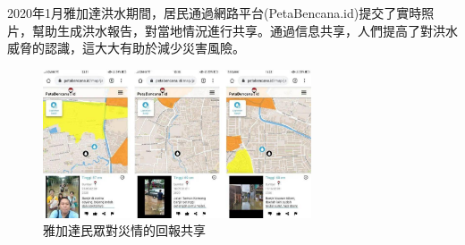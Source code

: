 \documentclass[a4paper,12pt]{article}
\begin{document}
2020年1月雅加達洪水期間，居民通過網路平台(PetaBencana.id)提交了實時照片，幫助生成洪水報告，對當地情況進行共享。通過信息共享，人們提高了對洪水威脅的認識，這大大有助於減少災害風險。\\
\begin{figure}[htbp]
\centering
\includegraphics[width=300]{images/qeKptHMBeElxlkkaE6x2.jpg}
\caption{\label{fig:Name}雅加達民眾對災情的回報共享}
\end{figure}
\end{document}
